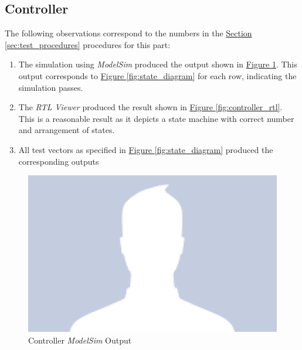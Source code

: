 
\subsection{Controller} %
\label{sub:controller}

The following observations correspond to the numbers in the \hyperref[sec:test_procedures]{Section \ref*{sec:test_procedures}} procedures for this part:

\begin{enumerate}
    \item The simulation using \emph{ModelSim} produced the output shown in \hyperref[fig:controller_output]{Figure \ref*{fig:controller_output}}.
    This output corresponds to \hyperref[fig:state_diagram]{Figure \ref*{fig:state_diagram}} for each row, indicating the simulation passes.
    \item The \emph{RTL Viewer} produced the result shown in \hyperref[fig:controller_rtl]{Figure \ref*{fig:controller_rtl}}.
    This is a reasonable result as it depicts a state machine with correct number and arrangement of states.
    \item All test vectors as specified in \hyperref[fig:state_diagram]{Figure \ref*{fig:state_diagram}} produced the corresponding outputs
\end{enumerate}

\begin{figure}
    \includegraphics[width=\textwidth]{images/controller_output.png}
    \caption{Controller \emph{ModelSim} Output\label{fig:controller_output}}
\end{figure}

